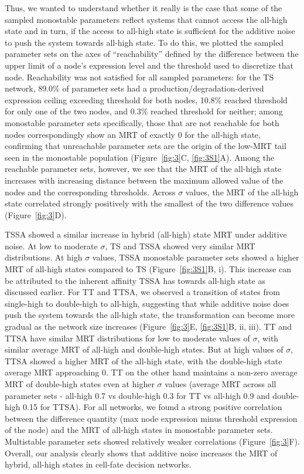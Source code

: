 \documentclass[11pt]{article}
\begin{document}
Thus, we wanted to understand whether it really is the case that some of the sampled monostable parameters reflect systems that cannot access the all-high state and in turn, if the access to all-high state is sufficient for the additive noise to push the system towards all-high state. To do this, we plotted the sampled parameter sets on the axes of ``reachability'' defined by the difference between the upper limit of a node's expression level and the threshold used to discretize that node. Reachability was not satisfied for all sampled parameters: for the TS network, 89.0\% of parameter sets had a production/degradation-derived expression ceiling exceeding threshold for both nodes, 10.8\% reached threshold for only one of the two nodes, and 0.3\% reached threshold for neither; among monostable parameter sets specifically, those that are not reachable for both nodes correspondingly show an MRT of exactly 0 for the all-high state, confirming that unreachable parameter sets are the origin of the low-MRT tail seen in the monostable population (Figure~\ref{fig:3}C, \ref{fig:3S1}A). Among the reachable parameter sets, however, we see that the MRT of the all-high state increases with increasing distance between the maximum allowed value of the nodes and the corresponding thresholds. Across $\sigma$ values, the MRT of the all-high state correlated strongly positively with the smallest of the two difference values (Figure~\ref{fig:3}D).

TSSA showed a similar increase in hybrid (all-high) state MRT under additive noise. At low to moderate $\sigma$, TS and TSSA showed very similar MRT distributions. At high $\sigma$ values, TSSA monostable parameter sets showed a higher MRT of all-high states compared to TS (Figure~\ref{fig:3S1}B, i). This increase can be attributed to the inherent affinity TSSA has towards all-high state as discussed earlier. For TT and TTSA, we observed a transition of states from single-high to double-high to all-high, suggesting that while additive noise does push the system towards the all-high state, the transformation can become more gradual as the network size increases (Figure~\ref{fig:3}E, \ref{fig:3S1}B, ii, iii). TT and TTSA have similar MRT distributions for low to moderate values of $\sigma$, with similar average MRT of all-high and double-high states. But at high values of $\sigma$, TTSA showed a higher MRT of the all-high state, with the double-high state average MRT approaching 0. TT on the other hand maintains a non-zero average MRT of double-high states even at higher $\sigma$ values (average MRT across all parameter sets - all-high 0.7 vs double-high 0.3 for TT vs all-high 0.9 and double-high 0.15 for TTSA). For all networks, we found a strong positive correlation between the difference quantity (max node expression minus threshold expression of the node) and the MRT of all-high states in monostable parameter sets. Multistable parameter sets showed relatively weaker correlations (Figure~\ref{fig:3}F). Overall, our analysis clearly shows that additive noise increases the MRT of hybrid, all-high states in cell-fate decision networks. 
\end{document}
